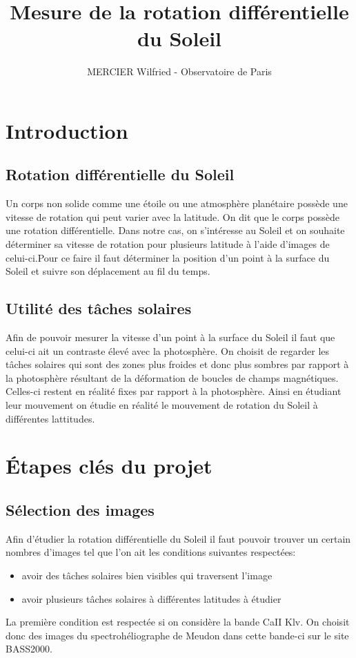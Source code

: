 \documentclass[a4paper,11pt]{article}
\numberwithin{equation}{section}
\begin{document}
\title{\LARGE \bf Mesure de la rotation différentielle du Soleil}
\author{MERCIER Wilfried - Observatoire de Paris}
\maketitle


\section{Introduction}
\subsection{Rotation différentielle du Soleil}
Un corps non solide comme une étoile ou une atmosphère planétaire possède une vitesse de rotation qui peut varier avec la latitude. On dit que le corps possède une rotation différentielle. Dans notre cas, on s'intéresse au Soleil et on souhaite déterminer sa vitesse de rotation pour plusieurs latitude à l'aide d'images de celui-ci.\newline Pour ce faire il faut déterminer la position d'un point à la surface du Soleil et suivre son déplacement au fil du temps.
\subsection{Utilité des tâches solaires}
Afin de pouvoir mesurer la vitesse d'un point à la surface du Soleil il faut que celui-ci ait un contraste élevé avec la photosphère. On choisit de regarder les tâches solaires qui sont des zones plus froides et donc plus sombres par rapport à la photosphère résultant de la déformation de boucles de champs magnétiques. Celles-ci restent en réalité fixes par rapport à la photosphère. Ainsi en étudiant leur mouvement on étudie en réalité le mouvement de rotation du Soleil à différentes lattitudes.


\section{Étapes clés du projet}
\subsection{Sélection des images}
Afin d'étudier la rotation différentielle du Soleil il faut pouvoir trouver un certain nombres d'images tel que l'on ait les conditions suivantes respectées:
\begin{itemize}
  \item avoir des tâches solaires bien visibles qui traversent l'image
  \item avoir plusieurs tâches solaires à différentes latitudes à étudier
\end{itemize}
La première condition est respectée si on considère la bande CaII Klv. On choisit donc des images du spectrohéliographe de Meudon dans cette bande-ci sur le site BASS2000.
\end{document}
